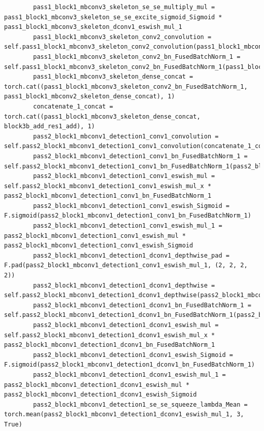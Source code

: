 \documentclass{fisatprojectfinal}
\begin{document}
\begin{appendices}
\begin{lstlisting}
        pass1_block1_mbconv3_skeleton_se_se_multiply_mul = pass1_block1_mbconv3_skeleton_se_se_excite_sigmoid_Sigmoid * pass1_block1_mbconv3_skeleton_dconv1_eswish_mul_1
        pass1_block1_mbconv3_skeleton_conv2_convolution = self.pass1_block1_mbconv3_skeleton_conv2_convolution(pass1_block1_mbconv3_skeleton_se_se_multiply_mul)
        pass1_block1_mbconv3_skeleton_conv2_bn_FusedBatchNorm_1 = self.pass1_block1_mbconv3_skeleton_conv2_bn_FusedBatchNorm_1(pass1_block1_mbconv3_skeleton_conv2_convolution)
        pass1_block1_mbconv3_skeleton_dense_concat = torch.cat((pass1_block1_mbconv3_skeleton_conv2_bn_FusedBatchNorm_1, pass1_block1_mbconv2_skeleton_dense_concat), 1)
        concatenate_1_concat = torch.cat((pass1_block1_mbconv3_skeleton_dense_concat, block3b_add_res1_add), 1)
        pass2_block1_mbconv1_detection1_conv1_convolution = self.pass2_block1_mbconv1_detection1_conv1_convolution(concatenate_1_concat)
        pass2_block1_mbconv1_detection1_conv1_bn_FusedBatchNorm_1 = self.pass2_block1_mbconv1_detection1_conv1_bn_FusedBatchNorm_1(pass2_block1_mbconv1_detection1_conv1_convolution)
        pass2_block1_mbconv1_detection1_conv1_eswish_mul = self.pass2_block1_mbconv1_detection1_conv1_eswish_mul_x * pass2_block1_mbconv1_detection1_conv1_bn_FusedBatchNorm_1
        pass2_block1_mbconv1_detection1_conv1_eswish_Sigmoid = F.sigmoid(pass2_block1_mbconv1_detection1_conv1_bn_FusedBatchNorm_1)
        pass2_block1_mbconv1_detection1_conv1_eswish_mul_1 = pass2_block1_mbconv1_detection1_conv1_eswish_mul * pass2_block1_mbconv1_detection1_conv1_eswish_Sigmoid
        pass2_block1_mbconv1_detection1_dconv1_depthwise_pad = F.pad(pass2_block1_mbconv1_detection1_conv1_eswish_mul_1, (2, 2, 2, 2))
        pass2_block1_mbconv1_detection1_dconv1_depthwise = self.pass2_block1_mbconv1_detection1_dconv1_depthwise(pass2_block1_mbconv1_detection1_dconv1_depthwise_pad)
        pass2_block1_mbconv1_detection1_dconv1_bn_FusedBatchNorm_1 = self.pass2_block1_mbconv1_detection1_dconv1_bn_FusedBatchNorm_1(pass2_block1_mbconv1_detection1_dconv1_depthwise)
        pass2_block1_mbconv1_detection1_dconv1_eswish_mul = self.pass2_block1_mbconv1_detection1_dconv1_eswish_mul_x * pass2_block1_mbconv1_detection1_dconv1_bn_FusedBatchNorm_1
        pass2_block1_mbconv1_detection1_dconv1_eswish_Sigmoid = F.sigmoid(pass2_block1_mbconv1_detection1_dconv1_bn_FusedBatchNorm_1)
        pass2_block1_mbconv1_detection1_dconv1_eswish_mul_1 = pass2_block1_mbconv1_detection1_dconv1_eswish_mul * pass2_block1_mbconv1_detection1_dconv1_eswish_Sigmoid
        pass2_block1_mbconv1_detection1_se_se_squeeze_lambda_Mean = torch.mean(pass2_block1_mbconv1_detection1_dconv1_eswish_mul_1, 3, True)

\end{lstlisting}
\end{appendices}
\end{document}
